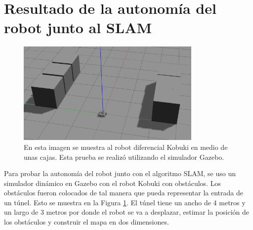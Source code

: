\section{Resultado de la autonomía del robot junto al SLAM}
\begin{figure}%
  \centering \footnotesize
  \includegraphics[width=0.80\textwidth]{images/gazebo_map.png}
  \captionsetup{font=footnotesize}
  \caption{En esta imagen se muestra al robot diferencial Kobuki en medio de unas cajas. Esta 
  prueba se realizó utilizando el simulador Gazebo.}
  \label{fig:Gazebo_simu}
\end{figure}
Para probar la autonomía del robot junto con el algoritmo SLAM, se uso un simulador dinámico 
en Gazebo con el robot Kobuki con obstáculos. Los obstáculos fueron colocados de tal manera
que pueda representar la entrada de un túnel. Esto se muestra en la Figura 
\ref{fig:Gazebo_simu}. El túnel tiene un ancho de 4 metros y un largo de 3 metros por donde 
el robot se va a desplazar, estimar la posición de los obstáculos y construir el mapa en dos 
dimensiones.

